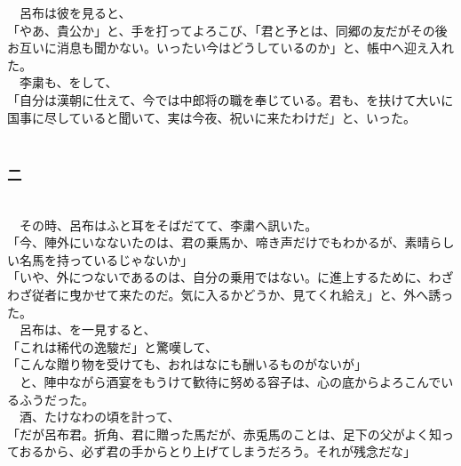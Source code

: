 \documentclass[
  paper=a5,
  fontsize=10pt,
  jafontsize=9.5pt,
  tate,                  %
  open_bracket_pos=nibu, %
]{jlreq}
\begin{document}
　呂布は彼を見ると、\\


「やあ、貴公か」と、手を打ってよろこび、「君と予とは、同郷の友だがその後お互いに消息も聞かない。いったい今はどうしているのか」と、帳中へ迎え入れた。\\


　李粛も、をして、\\


「自分は漢朝に仕えて、今では中郎将の職を奉じている。君も、を扶けて大いに国事に尽していると聞いて、実は今夜、祝いに来たわけだ」と、いった。\\

\\

\subsubsection{二}

\\


　その時、呂布はふと耳をそばだてて、李粛へ訊いた。\\


「今、陣外にいなないたのは、君の乗馬か、啼き声だけでもわかるが、素晴らしい名馬を持っているじゃないか」\\


「いや、外につないであるのは、自分の乗用ではない。に進上するために、わざわざ従者に曳かせて来たのだ。気に入るかどうか、見てくれ給え」と、外へ誘った。\\


　呂布は、を一見すると、\\


「これは稀代の逸駿だ」と驚嘆して、\\


「こんな贈り物を受けても、おれはなにも酬いるものがないが」\\


　と、陣中ながら酒宴をもうけて歓待に努める容子は、心の底からよろこんでいるふうだった。\\


　酒、たけなわの頃を計って、\\


「だが呂布君。折角、君に贈った馬だが、赤兎馬のことは、足下の父がよく知っておるから、必ず君の手からとり上げてしまうだろう。それが残念だな」\\
\end{document}
